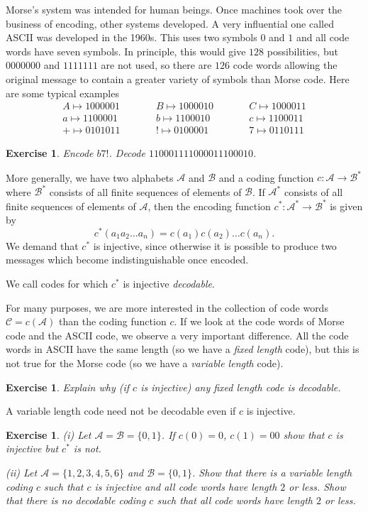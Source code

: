 \documentclass[12pt,a4paper]{article}
\theoremstyle{plain}
\newtheorem{exercise}[theorem]{Exercise}
\theoremstyle{definition}
\begin{document}
Morse's system was intended for human beings.
Once machines took over the business of encoding, 
other systems developed. A very influential
one called ASCII was developed in the 1960s.
This uses two symbols $0$ and $1$
and all code words have seven symbols.
In principle, this would give $128$ possibilities, but $0000000$
and $1111111$ are not used, so there are $126$ code words
allowing the original message to contain a greater
variety of symbols than Morse code. 
Here are some typical examples
\begin{align*}
A\mapsto 1000001\qquad
&&B\mapsto 1000010\qquad
&&C\mapsto 1000011\\
a\mapsto 1100001\qquad
&&b\mapsto 1100010 \qquad
&&c\mapsto 1100011\\
+\mapsto 0101011\qquad
&&!\mapsto 0100001\qquad
&&7\mapsto 0110111
\end{align*}
\begin{exercise}\label{E;ASCII} 
Encode $b7!$. Decode $110001111000011100010$.
\end{exercise}

More generally, we have two alphabets ${\mathcal A}$
and ${\mathcal B}$ 
and a coding function $c:{\mathcal A}\rightarrow{\mathcal B}^{*}$
where ${\mathcal B}^{*}$ consists of all finite sequences of 
elements of  ${\mathcal B}$.
If  ${\mathcal A}^{*}$ consists of all finite sequences 
of elements of  ${\mathcal A}$,
then the encoding function 
$c^{*}:{\mathcal A}^{*}\rightarrow{\mathcal B}^{*}$
is given by
\[c^{*}(a_{1}a_{2}\ldots a_{n})=c(a_{1})c(a_{2})\dots c(a_{n}).\]
We demand that $c^{*}$ is injective, since otherwise
it is possible to produce two
messages which become indistinguishable once encoded.

We call codes for which $c^{*}$ is injective \emph{decodable}.

For many purposes, we are more interested
in the collection of code words ${\mathcal C}=c({\mathcal A})$
than the coding function $c$. If we look
at the code words of Morse code and the ASCII code, we
observe a very important difference.
All the code words in ASCII have the same length 
(so we have a \emph{fixed length} code),
but this is not true for the Morse code
(so we have a \emph{variable length} code).
\begin{exercise}\label{E;fix length} Explain why (if $c$ is injective) 
any fixed length code
is  decodable.
\end{exercise}

A variable length code need not be decodable even 
if $c$ is injective.
\begin{exercise}\label{E;decodable} 
(i) Let ${\mathcal A}={\mathcal B}=\{0,1\}$. If
$c(0)=0$, $c(1)=00$ show that $c$ is injective but $c^{*}$ is not.
 
(ii) Let ${\mathcal A}=\{1,2,3,4,5,6\}$ and ${\mathcal B}=\{0,1\}$.
Show that there is a variable length coding $c$ such that
$c$ is injective and all code words have length $2$ or less.
Show that there is no decodable coding $c$ such that
all code words have length $2$ or less.
\end{exercise}
\end{document}
